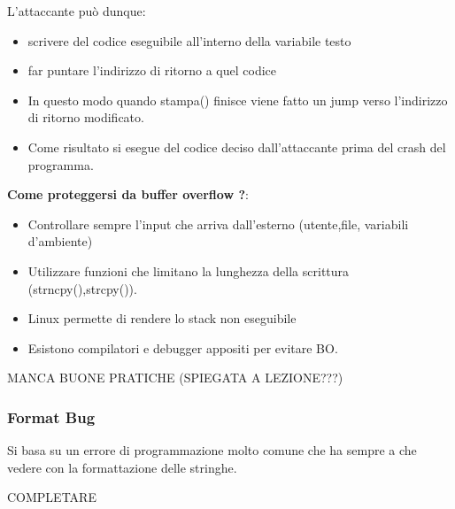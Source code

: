 \documentclass[12pt]{article}
\begin{document}
				L'attaccante può dunque:
				\begin{itemize}
					\item scrivere del codice eseguibile all'interno della variabile testo 
					\item far puntare l'indirizzo di ritorno a quel codice
					\item In questo modo quando stampa() finisce viene fatto un jump verso l'indirizzo di ritorno modificato.
					\item Come risultato si esegue del codice deciso dall'attaccante prima del crash del programma.
				\end{itemize}
				\textbf{Come proteggersi da buffer overflow ?}:
				\begin{itemize}
					\item Controllare sempre l'input che arriva dall'esterno (utente,file, variabili d'ambiente) 
					\item Utilizzare funzioni che limitano la lunghezza della scrittura (strncpy(),strcpy()).
					\item  Linux permette di rendere lo stack non eseguibile
					\item Esistono compilatori e debugger appositi per evitare BO.
				\end{itemize}
			
				MANCA BUONE PRATICHE (SPIEGATA A LEZIONE???)\\
				
			\subsubsection{Format Bug}
				Si basa su un errore di programmazione molto comune che ha sempre a che vedere con la formattazione delle stringhe.
				
				COMPLETARE
\end{document}
